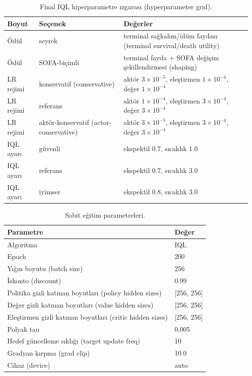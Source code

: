 \documentclass[conference]{IEEEtran}
\begin{document}
\begin{table}[t]
\centering
\caption{Final IQL hiperparametre ızgarası (hyperparameter grid).}
\label{tab:grid_full}
\begin{tabular}{lll}
\toprule
Boyut & Seçenek & Değerler \\
\midrule
Ödül & seyrek & terminal sağkalım/ölüm faydası (terminal survival/death utility) \\
Ödül & SOFA-biçimli & terminal fayda + SOFA değişim şekillendirmesi (shaping) \\
LR rejimi & konservatif (conservative) & aktör $3\times10^{-5}$, eleştirmen $1\times10^{-4}$, değer $1\times10^{-4}$ \\
LR rejimi & referans & aktör $1\times10^{-4}$, eleştirmen $3\times10^{-4}$, değer $3\times10^{-4}$ \\
LR rejimi & aktör-konservatif (actor-conservative) & aktör $3\times10^{-5}$, eleştirmen $3\times10^{-4}$, değer $3\times10^{-4}$ \\
IQL ayarı & güvenli & ekspektil 0.7, sıcaklık 1.0 \\
IQL ayarı & referans & ekspektil 0.7, sıcaklık 3.0 \\
IQL ayarı & iyimser & ekspektil 0.8, sıcaklık 3.0 \\
\bottomrule
\end{tabular}
\end{table}

\begin{table}[t]
\centering
\caption{Sabit eğitim parametreleri.}
\label{tab:fixed_params}
\begin{tabular}{ll}
\toprule
Parametre & Değer \\
\midrule
Algoritma & IQL \\
Epoch & 200 \\
Yığın boyutu (batch size) & 256 \\
İskonto (discount) & 0.99 \\
Politika gizli katman boyutları (policy hidden sizes) & [256, 256] \\
Değer gizli katman boyutları (value hidden sizes) & [256, 256] \\
Eleştirmen gizli katman boyutları (critic hidden sizes) & [256, 256] \\
Polyak tau & 0.005 \\
Hedef güncelleme sıklığı (target update freq) & 10 \\
Gradyan kırpma (grad clip) & 10.0 \\
Cihaz (device) & auto \\
\bottomrule
\end{tabular}
\end{table}
\end{document}
